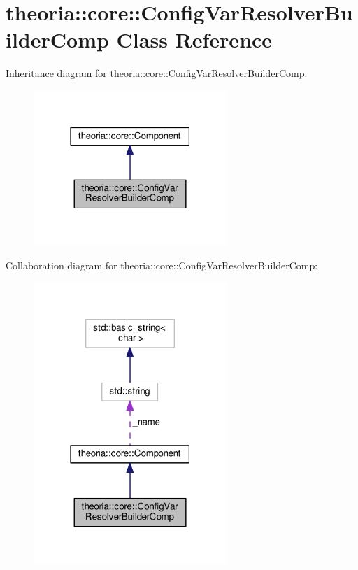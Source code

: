 \hypertarget{classtheoria_1_1core_1_1ConfigVarResolverBuilderComp}{\section{theoria\+:\+:core\+:\+:Config\+Var\+Resolver\+Builder\+Comp Class Reference}
\label{classtheoria_1_1core_1_1ConfigVarResolverBuilderComp}
}


Inheritance diagram for theoria\+:\+:core\+:\+:Config\+Var\+Resolver\+Builder\+Comp\+:
\nopagebreak
\begin{figure}[H]
\begin{center}
\leavevmode
\includegraphics[width=207pt]{classtheoria_1_1core_1_1ConfigVarResolverBuilderComp__inherit__graph}
\end{center}
\end{figure}


Collaboration diagram for theoria\+:\+:core\+:\+:Config\+Var\+Resolver\+Builder\+Comp\+:
\nopagebreak
\begin{figure}[H]
\begin{center}
\leavevmode
\includegraphics[width=207pt]{classtheoria_1_1core_1_1ConfigVarResolverBuilderComp__coll__graph}
\end{center}
\end{figure}
